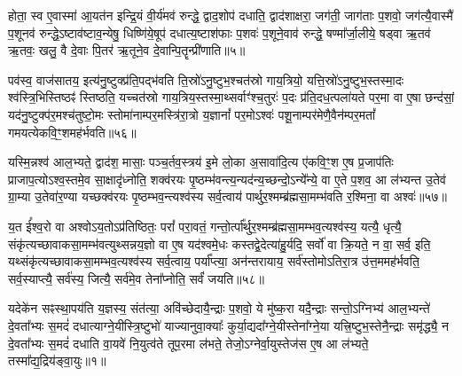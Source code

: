 होता॒ स्व ए॒वास्मा॑ आ॒यत॑न इन्द्रि॒यं वी॒र्य॑मव॑ रुन्द्धे॒ द्वाद॒शोप॑ दधाति॒ द्वाद॑शाक्षरा॒ जग॑ती॒ जाग॑ताः प॒शवो॒ जग॑त्यै॒वास्मै॑ प॒शूनव॑ रुन्द्धे॒\-ऽष्टाव॑ष्टाव॒न्येषु॒ धिष्णि॑ये॒षूप॑ दधात्य॒ष्टाश॑फाः प॒शवः॑ प॒शूने॒वाव॑ रुन्द्धे॒ षण्मा᳚र्जा॒लीये॒ षड्वा ऋ॒तव॑ ऋ॒तवः॒ खलु॒ वै दे॒वाः पि॒तर॑ ऋ॒तूने॒व दे॒वान्पि॒तॄन्प्री॑णाति॥५॥

{}

पव॑स्व॒ वाज॑सातय॒ इत्य॑नु॒ष्टुक्प्र॑ति॒पद्भ॑वति ति॒स्रो॑\-ऽनु॒ष्टुभ॒श्चत॑स्रो गाय॒त्रियो॒ यत्ति॒स्रो॑\-ऽनु॒ष्टुभ॒स्तस्मा॒दः श्व॑स्त्रि॒भिस्तिष्ठꣴ॑ स्तिष्ठति॒ यच्चत॑स्रो गाय॒त्रिय॒स्तस्मा॒थ्सर्वाꣳ॑श्च॒तुरः॑ प॒दः प्र॑ति॒दध॒त्पला॑यते पर॒मा वा ए॒षा छन्द॑सां॒ यद॑नु॒ष्टुक्प॑र॒मश्च॑तुष्टो॒मः स्तोमा॑नाम्पर॒मस्त्रि॑रा॒त्रो य॒ज्ञानां᳚ पर॒मो\-ऽश्वः॑ पशू॒नाम्पर॑मेणै॒वैन॑म्पर॒मतां᳚ गमयत्येकवि॒ꣳ॒शमह॑र्भवति॥५६॥

यस्मि॒न्नश्व॑ आल॒भ्यते॒ द्वाद॑श॒ मासाः॒ पञ्च॒र्तव॒स्त्रय॑ इ॒मे लो॒का अ॒सावा॑दि॒त्य ए॑कवि॒ꣳ॒श ए॒ष प्र॒जाप॑तिः प्राजाप॒त्यो\-ऽश्व॒स्तमे॒व सा॒क्षादृ॑ध्नोति॒ शक्व॑रयः पृ॒ष्ठम्भ॑वन्त्य॒न्यद॑न्य॒च्छन्दो॒\-ऽन्ये᳚न्ये॒ वा ए॒ते प॒शव॒ आ ल॑भ्यन्त उ॒तेव॑ ग्रा॒म्या उ॒तेवा॑र॒ण्या यच्छक्व॑रयः पृ॒ष्ठम्भव॒न्त्यश्व॑स्य सर्व॒त्वाय॑ पार्थुर॒श्मम्ब्र॑ह्मसा॒मम्भ॑वति र॒श्मिना॒ वा अश्वः॑॥५७॥

य॒त ई᳚श्व॒रो वा अश्वो\-ऽय॒तो\-ऽप्र॑तिष्ठितः॒ परां᳚ परा॒वतं॒ गन्तो॒र्त्पा᳚र्थुर॒श्मम्ब्र॑ह्मसा॒मम्भव॒त्यश्व॑स्य॒ यत्यै॒ धृत्यै॒ संकृ॑त्यच्छावाकसा॒मम्भ॑वत्युथ्सन्नय॒ज्ञो वा ए॒ष यद॑श्वमे॒धः कस्तद्वे॒देत्या॑हु॒र्यदि॒ सर्वो॑ वा क्रि॒यते॒ न वा॒ सर्व॒ इति॒ यथ्संकृ॑त्यच्छावाकसा॒मम्भव॒त्यश्व॑स्य सर्व॒त्वाय॒ पर्या᳚प्त्या॒ अन॑न्तरायाय॒ सर्व॑स्तोमो\-ऽतिरा॒त्र उ॑त्त॒ममह॑र्भवति॒ सर्व॒स्याप्त्यै॒ सर्व॑स्य॒ जित्यै॒ सर्व॑मे॒व तेना᳚प्नोति॒ सर्वं॑ जयति॥५८॥

{}


{}

\setcounter{anuvakam}{0}
यदेके॑न सꣴस्था॒पय॑ति य॒ज्ञस्य॒ संत॑त्या॒ अवि॑च्छेदायै॒न्द्राः प॒शवो॒ ये मु॑ष्क॒रा यदै॒न्द्राः सन्तो॒\-ऽग्निभ्य॑ आल॒भ्यन्ते॑ दे॒वता᳚भ्यः स॒मदं॑ दधात्याग्ने॒यीस्त्रि॒ष्टुभो॑ याज्यानुवा॒क्याः᳚ कुर्या॒द्यदा᳚ग्ने॒यीस्तेना᳚ग्ने॒या यत्त्रि॒ष्टुभ॒स्तेनै॒न्द्राः समृ॑द्ध्यै॒ न दे॒वता᳚भ्यः स॒मदं॑ दधाति वा॒यवे॑ नि॒युत्व॑ते तूप॒रमा ल॑भते॒ तेजो॒\-ऽग्नेर्वा॒युस्तेज॑स ए॒ष आ ल॑भ्यते॒ तस्मा᳚द्य॒द्रिय॑ङ्वा॒युः॥१॥

